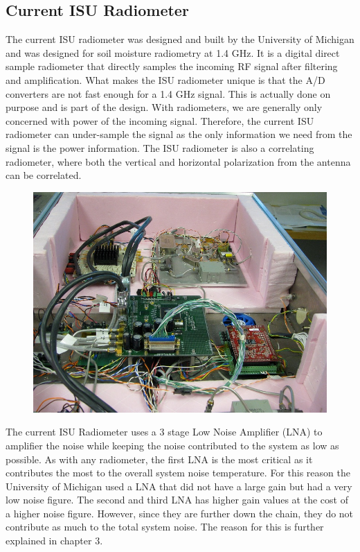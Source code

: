 
\subsection{Current ISU Radiometer}
The current ISU radiometer was designed and built by the University of Michigan and was designed for soil moisture radiometry at 1.4 GHz.  It is a digital direct sample radiometer that directly samples the incoming RF signal after filtering and amplification.  What makes the ISU radiometer unique is that the A/D converters are not fast enough for a 1.4 GHz signal.  This is actually done on purpose and is part of the design.  With radiometers, we are generally only concerned with power of the incoming signal.  Therefore, the current ISU radiometer can under-sample the signal as the only information we need from the signal is the power information.  The ISU radiometer is also a correlating radiometer, where both the vertical and horizontal polarization from the antenna can be correlated.  

{\begin{figure}[h!tb] 
\centering
\includegraphics{Images/IMG_0027}
\label{ISU_Rad}
\end{figure}
}
The current ISU Radiometer uses a 3 stage Low Noise Amplifier (LNA) to amplifier the noise while keeping the noise contributed to the system as low as possible.  As with any radiometer, the first LNA is the most critical as it contributes the most to the overall system noise temperature.  For this reason the University of Michigan used a LNA that did not have a large gain but had a very low noise figure. The second and third LNA has higher gain values at the cost of a higher noise figure.  However, since they are further down the chain, they do not contribute as much to the total system noise.  The reason for this is further explained in chapter 3.  

